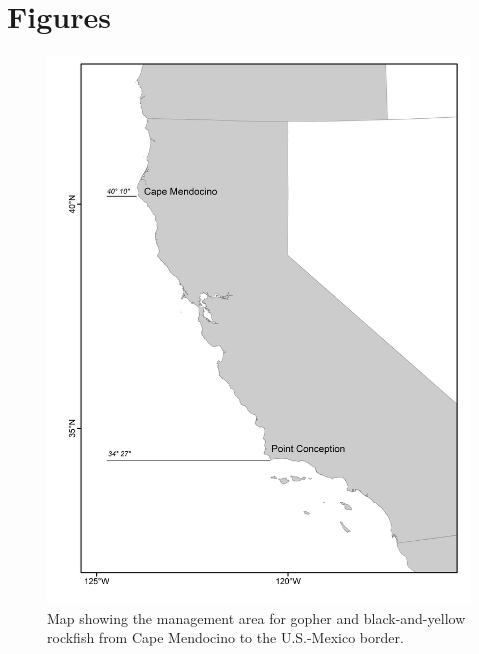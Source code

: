 \documentclass[12pt,]{article}
\begin{document}
\FloatBarrier

\newpage

\newpage

\FloatBarrier

\FloatBarrier

\newpage

\section{Figures}\label{figures}

\begin{figure}
\centering
\includegraphics{Figures/assess_region_map.png}
\caption{Map showing the management area for gopher and black-and-yellow
rockfish from Cape Mendocino to the U.S.-Mexico border.
\label{fig:assess_region_map1}}
\end{figure}
\end{document}

